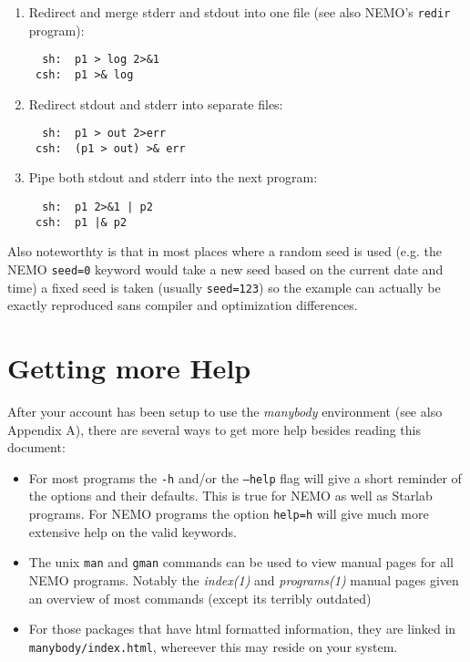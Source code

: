 \begin{enumerate}
\item 
Redirect and merge stderr and stdout into one file 
(see also NEMO's {\tt redir} program):
\footnotesize\begin{verbatim}
  sh:  p1 > log 2>&1
 csh:  p1 >& log
\end{verbatim}\normalsize
\item
Redirect stdout and stderr into separate files:
\footnotesize\begin{verbatim}
  sh:  p1 > out 2>err
 csh:  (p1 > out) >& err
\end{verbatim}\normalsize
\item
Pipe both stdout and stderr into the next program:
\footnotesize\begin{verbatim}
  sh:  p1 2>&1 | p2
 csh:  p1 |& p2
\end{verbatim}\normalsize
\end{enumerate}

Also noteworthty is that 
in most places where a random seed is used (e.g. the NEMO {\tt seed=0} keyword
would take a new seed based on the current date and time) 
a fixed seed is taken (usually {\tt seed=123}) 
so the example can actually be exactly reproduced sans compiler and optimization
differences.


\section*{Getting more Help}

After your account has been setup to use the {\it manybody} environment
(see also Appendix A), there are several ways to get more help besides
reading this document:
\begin{itemize}
\item
For most programs the {\tt -h} and/or the {\tt --help} flag will give a short
reminder of the options and their defaults. This is true for NEMO as well
as Starlab programs.
For NEMO programs the option {\tt help=h} will give much more extensive help
on the valid keywords.

\item
The unix {\tt man} and {\tt gman} commands can be used to view manual pages
for all NEMO programs. Notably the {\it index(1)} and {\it programs(1)}
manual pages given an overview of most commands (except its terribly
outdated)

\item
For those packages that have html formatted information, they are
linked in {\tt manybody/index.html}, whereever this may reside on your
system.

\end{itemize}

